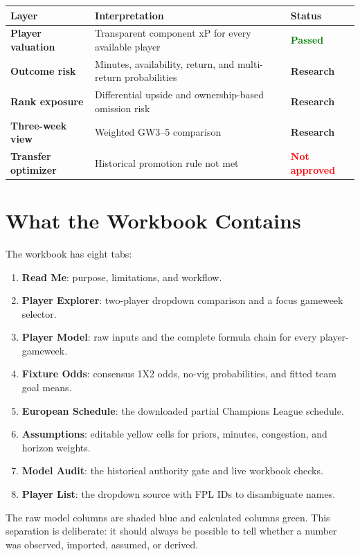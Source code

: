 \documentclass[11pt,a4paper]{article}
\newcommand{\pass}{\textcolor{Green}{\textbf{Passed}}}
\newcommand{\research}{\textcolor{Amber}{\textbf{Research}}}
\newcommand{\fail}{\textcolor{Red}{\textbf{Not approved}}}
\begin{document}
\begin{center}
\begin{tabularx}{0.94\textwidth}{>{\bfseries}l X l}
\toprule
Layer & Interpretation & Status\\
\midrule
Player valuation & Transparent component xP for every available player & \pass\\
Outcome risk & Minutes, availability, return, and multi-return probabilities & \research\\
Rank exposure & Differential upside and ownership-based omission risk & \research\\
Three-week view & Weighted GW3--5 comparison & \research\\
Transfer optimizer & Historical promotion rule not met & \fail\\
\bottomrule
\end{tabularx}
\end{center}

\section{What the Workbook Contains}

The workbook has eight tabs:

\begin{enumerate}
  \item \textbf{Read Me}: purpose, limitations, and workflow.
  \item \textbf{Player Explorer}: two-player dropdown comparison and a focus gameweek selector.
  \item \textbf{Player Model}: raw inputs and the complete formula chain for every player-gameweek.
  \item \textbf{Fixture Odds}: consensus 1X2 odds, no-vig probabilities, and fitted team goal means.
  \item \textbf{European Schedule}: the downloaded partial Champions League schedule.
  \item \textbf{Assumptions}: editable yellow cells for priors, minutes, congestion, and horizon weights.
  \item \textbf{Model Audit}: the historical authority gate and live workbook checks.
  \item \textbf{Player List}: the dropdown source with FPL IDs to disambiguate names.
\end{enumerate}

The raw model columns are shaded blue and calculated columns green. This separation is deliberate: it should always be possible to tell whether a number was observed, imported, assumed, or derived.
\end{document}

